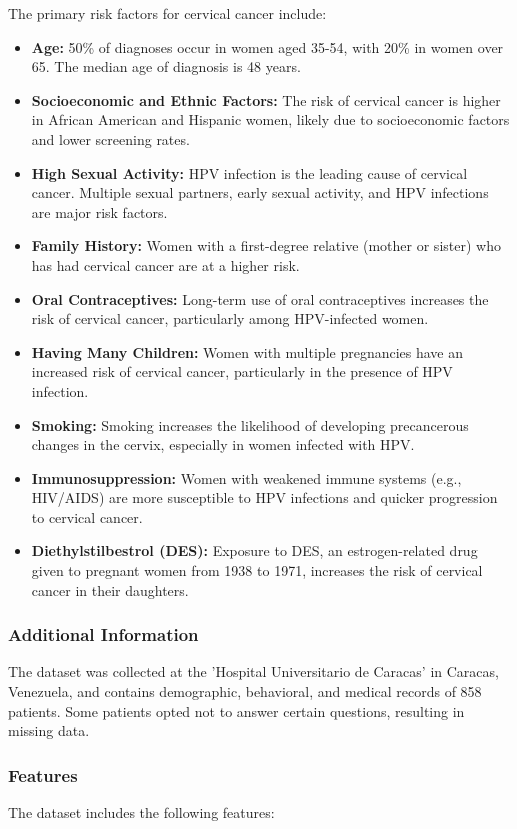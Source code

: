 \documentclass{llncs}
\begin{document}
The primary risk factors for cervical cancer include:
\begin{itemize}
	\item \textbf{Age:} 50\% of diagnoses occur in women aged 35-54, with 20\% in women over 65. The median age of diagnosis is 48 years.
	\item \textbf{Socioeconomic and Ethnic Factors:} The risk of cervical cancer is higher in African American and Hispanic women, likely due to socioeconomic factors and lower screening rates.
	\item \textbf{High Sexual Activity:} HPV infection is the leading cause of cervical cancer. Multiple sexual partners, early sexual activity, and HPV infections are major risk factors.
	\item \textbf{Family History:} Women with a first-degree relative (mother or sister) who has had cervical cancer are at a higher risk.
	\item \textbf{Oral Contraceptives:} Long-term use of oral contraceptives increases the risk of cervical cancer, particularly among HPV-infected women.
	\item \textbf{Having Many Children:} Women with multiple pregnancies have an increased risk of cervical cancer, particularly in the presence of HPV infection.
	\item \textbf{Smoking:} Smoking increases the likelihood of developing precancerous changes in the cervix, especially in women infected with HPV.
	\item \textbf{Immunosuppression:} Women with weakened immune systems (e.g., HIV/AIDS) are more susceptible to HPV infections and quicker progression to cervical cancer.
	\item \textbf{Diethylstilbestrol (DES):} Exposure to DES, an estrogen-related drug given to pregnant women from 1938 to 1971, increases the risk of cervical cancer in their daughters.
\end{itemize}

\subsubsection{Additional Information}
The dataset was collected at the 'Hospital Universitario de Caracas' in Caracas, Venezuela, and contains demographic, behavioral, and medical records of 858 patients. Some patients opted not to answer certain questions, resulting in missing data.

\subsubsection{Features}
The dataset includes the following features:
\end{document}
